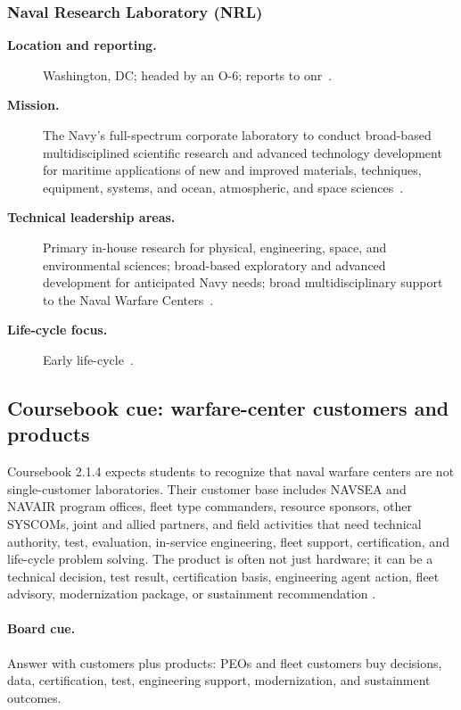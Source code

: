 \documentclass[../main.tex]{subfiles}
\begin{document}
\subsubsection{Naval Research Laboratory (NRL)}
\begin{description}
  \item[\textbf{Location and reporting.}] Washington, DC; headed by an O-6; reports to \ac{onr}~\autocite{edo-2-1-4-warfare-centers-2024}.
  \item[\textbf{Mission.}] The Navy's full-spectrum corporate laboratory to conduct broad-based multidisciplined scientific research and advanced technology development for maritime applications of new and improved materials, techniques, equipment, systems, and ocean, atmospheric, and space sciences~\autocite{edo-2-1-4-warfare-centers-2024}.
  \item[\textbf{Technical leadership areas.}] Primary in-house research for physical, engineering, space, and environmental sciences; broad-based exploratory and advanced development for anticipated Navy needs; broad multidisciplinary support to the Naval Warfare Centers~\autocite{edo-2-1-4-warfare-centers-2024}.
  \item[\textbf{Life-cycle focus.}] Early life-cycle~\autocite{edo-2-1-4-warfare-centers-2024}.
\end{description}

\subsection{Coursebook cue: warfare-center customers and products}

Coursebook 2.1.4 expects students to recognize that naval warfare centers are
not single-customer laboratories.  Their customer base includes NAVSEA and
NAVAIR program offices, fleet type commanders, resource sponsors, other SYSCOMs,
joint and allied partners, and field activities that need technical authority,
test, evaluation, in-service engineering, fleet support, certification, and
life-cycle problem solving.  The product is often not just hardware; it can be a
technical decision, test result, certification basis, engineering agent action,
fleet advisory, modernization package, or sustainment recommendation
\autocite{edo-2-1-4-warfare-centers-2024}.

\paragraph{Board cue.}
Answer with customers plus products: PEOs and fleet customers buy decisions,
data, certification, test, engineering support, modernization, and sustainment
outcomes.
\end{document}
